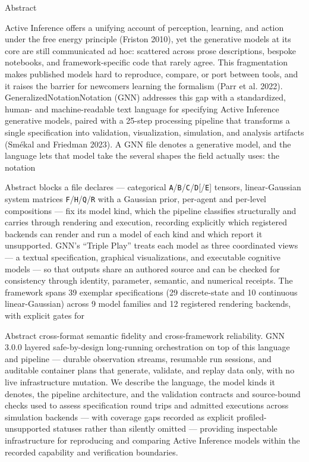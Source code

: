\documentclass[
  ignorenonframetext,
]{beamer}
\begin{document}
\begin{frame}{Abstract}

Active Inference offers a unifying account of perception, learning, and
action under the free energy principle (Friston 2010), yet the
generative models at its core are still communicated ad hoc: scattered
across prose descriptions, bespoke notebooks, and framework-specific
code that rarely agree. This fragmentation makes published models hard
to reproduce, compare, or port between tools, and it raises the barrier
for newcomers learning the formalism (Parr et al. 2022).
GeneralizedNotationNotation (GNN) addresses this gap with a
standardized, human- and machine-readable text language for specifying
Active Inference generative models, paired with a 25-step processing
pipeline that transforms a single specification into validation,
visualization, simulation, and analysis artifacts (Smékal and Friedman
2023). A GNN file denotes a generative model, and the language lets that
model take the several shapes the field actually uses: the notation
\end{frame}

\begin{frame}{Abstract}
blocks a file declares --- categorical
\texttt{A}/\texttt{B}/\texttt{C}/\texttt{D}{[}/\texttt{E}{]} tensors,
linear-Gaussian system matrices
\texttt{F}/\texttt{H}/\texttt{Q}/\texttt{R} with a Gaussian prior,
per-agent and per-level compositions --- fix its model kind, which the
pipeline classifies structurally and carries through rendering and
execution, recording explicitly which registered backends can render and
run a model of each kind and which report it unsupported. GNN's ``Triple
Play'' treats each model as three coordinated views --- a textual
specification, graphical visualizations, and executable cognitive models
--- so that outputs share an authored source and can be checked for
consistency through identity, parameter, semantic, and numerical
receipts. The framework spans 39 exemplar specifications (29
discrete-state and 10 continuous linear-Gaussian) across 9 model
families and 12 registered rendering backends, with explicit gates for
\end{frame}

\begin{frame}{Abstract}
cross-format semantic fidelity and cross-framework reliability. GNN
3.0.0 layered safe-by-design long-running orchestration on top of this
language and pipeline --- durable observation streams, resumable run
sessions, and auditable container plans that generate, validate, and
replay data only, with no live infrastructure mutation. We describe the
language, the model kinds it denotes, the pipeline architecture, and the
validation contracts and source-bound checks used to assess
specification round trips and admitted executions across simulation
backends --- with coverage gaps recorded as explicit
profiled-unsupported statuses rather than silently omitted --- providing
inspectable infrastructure for reproducing and comparing Active
Inference models within the recorded capability and verification
boundaries.
\end{frame}
\end{document}
